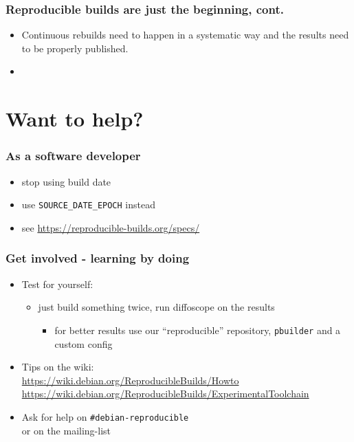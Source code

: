 \documentclass[14pt]{beamer}
\begin{document}
\begin{frame}
 \frametitle{Reproducible builds are just the beginning, cont.}
 \begin{itemize}
  \item Continuous rebuilds need to happen in a systematic way and the
  results need to be properly published.
  \item{}
 \end{itemize}
\end{frame}


\section{Want to help?}

\begin{frame}
 \frametitle{As a software developer}
 \begin{itemize}
  \item stop using build date
  \item use \texttt{SOURCE\_DATE\_EPOCH} instead \\
  \item see  \url{https://reproducible-builds.org/specs/}
 \end{itemize}
\end{frame}

\begin{frame}
 \frametitle{Get involved - learning by doing}

 \begin{itemize}
  \item Test for yourself:
   \begin{itemize}
    \item just build something twice, run diffoscope on the results
    \begin{itemize}
     \item for better results use our “reproducible” repository, \texttt{pbuilder} and a custom config
    \end{itemize}
   \end{itemize}

  \item Tips on the wiki: \\
    {\small \url{https://wiki.debian.org/ReproducibleBuilds/Howto}} \\
    {\small
    \url{https://wiki.debian.org/ReproducibleBuilds/ExperimentalToolchain}}
  \item Ask for help on \texttt{\#debian-reproducible} \\
   or on the mailing-list
 \end{itemize}
\end{frame}
\end{document}
